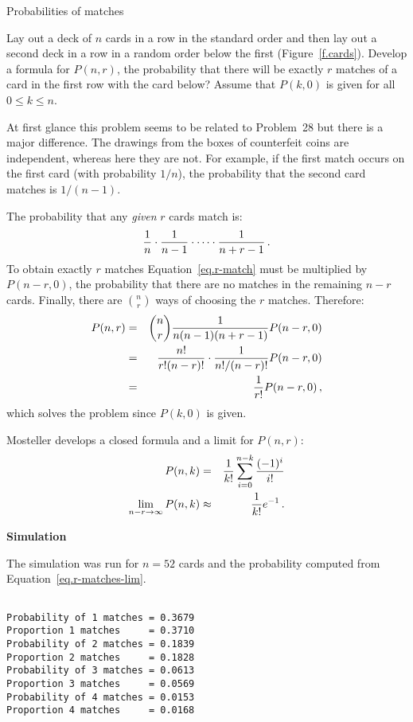 
\begin{prob}{Probabilities of matches}

Lay out a deck of $n$ cards in a row in the standard order and then lay out a second deck in a row in a random order below the first (Figure~\ref{f.cards}). Develop a formula for $P(n,r)$, the probability that there will be exactly $r$ matches of a card in the first row with the card below? Assume that $P(k,0)$ is given for all $0\leq k\leq n$.
\end{prob}

\solution{}

At first glance this problem seems to be related to Problem~28 but there is a major difference. The drawings from the boxes of counterfeit coins are independent, whereas here they are not. For example, if the first match occurs on the first card (with probability $1/n$), the probability that the second card matches is $1/(n-1)$.

The probability that any \emph{given} $r$ cards match is:
\begin{equation}\label{eq.r-match}
\displaystyle\frac{1}{n}\cdot \displaystyle\frac{1}{n-1}\cdot \cdots \cdot \displaystyle\frac{1}{n+r-1}\,.
\end{equation}
To obtain exactly $r$ matches Equation~\ref{eq.r-match} must be multiplied by $P(n-r,0)$, the probability that there are no matches in the remaining $n-r$ cards. Finally, there are ${n\choose r}$ ways of choosing the $r$ matches. Therefore:
\begin{eqnarray*}
P(n,r)&=& \displaystyle{n \choose r}\displaystyle\frac{1}{n(n-1)(n+r-1)} P(n-r,0)\\
&=& \displaystyle\frac{n!}{r!(n-r)!}\cdot\displaystyle\frac{1}{n!/(n-r)!}P(n-r,0)\\
&=&\displaystyle\frac{1}{r!}P(n-r,0)\,,
\end{eqnarray*}
which solves the problem since $P(k,0)$ is given.

Mosteller develops a closed formula and a limit for $P(n,r)$:
\begin{eqnarray}
P(n,k)&=&\displaystyle\frac{1}{k!}\sum_{i=0}^{n-k} \displaystyle\frac{(-1)^i}{i!}\\
\label{eq.r-matches-lim}
\lim_{n-r\rightarrow \infty} P(n,k)&\approx& \displaystyle\frac{1}{k!}e^{-1}\,.
\end{eqnarray}

\textbf{Simulation}

The simulation was run for $n=52$ cards and the probability computed from Equation~\ref{eq.r-matches-lim}.
\begin{verbatim}

Probability of 1 matches = 0.3679
Proportion 1 matches     = 0.3710
Probability of 2 matches = 0.1839
Proportion 2 matches     = 0.1828
Probability of 3 matches = 0.0613
Proportion 3 matches     = 0.0569
Probability of 4 matches = 0.0153
Proportion 4 matches     = 0.0168
\end{verbatim}

